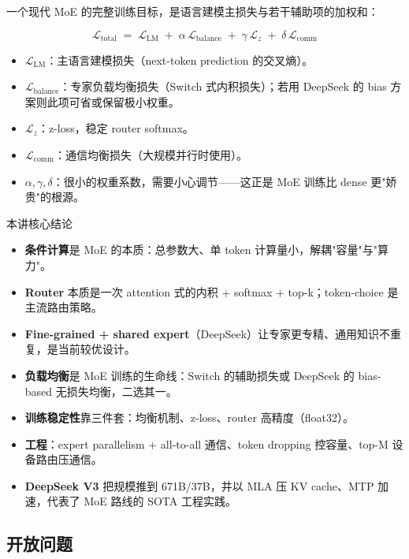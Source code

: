 \documentclass[a4paper]{article}
\begin{document}
一个现代 MoE 的完整训练目标，是语言建模主损失与若干辅助项的加权和：

\[
\mathcal{L}_{\text{total}} \;=\; \mathcal{L}_{\text{LM}} \;+\; \alpha\,\mathcal{L}_{\text{balance}} \;+\; \gamma\,\mathcal{L}_{z} \;+\; \delta\,\mathcal{L}_{\text{comm}}
\]

\begin{itemize}
\item $\mathcal{L}_{\text{LM}}$：主语言建模损失（next-token prediction 的交叉熵）。
\item $\mathcal{L}_{\text{balance}}$：专家负载均衡损失（Switch 式内积损失）；若用 DeepSeek 的 bias 方案则此项可省或保留极小权重。
\item $\mathcal{L}_{z}$：z-loss，稳定 router softmax。
\item $\mathcal{L}_{\text{comm}}$：通信均衡损失（大规模并行时使用）。
\item $\alpha,\gamma,\delta$：很小的权重系数，需要小心调节——这正是 MoE 训练比 dense 更"娇贵"的根源。
\end{itemize}

\begin{knowledgebox}{本讲核心结论}
\begin{itemize}
\item \textbf{条件计算}是 MoE 的本质：总参数大、单 token 计算量小，解耦"容量"与"算力"。
\item \textbf{Router} 本质是一次 attention 式的内积 + softmax + top-k；token-choice 是主流路由策略。
\item \textbf{Fine-grained + shared expert}（DeepSeek）让专家更专精、通用知识不重复，是当前较优设计。
\item \textbf{负载均衡}是 MoE 训练的生命线：Switch 的辅助损失或 DeepSeek 的 bias-based 无损失均衡，二选其一。
\item \textbf{训练稳定性}靠三件套：均衡机制、z-loss、router 高精度（float32）。
\item \textbf{工程}：expert parallelism + all-to-all 通信、token dropping 控容量、top-M 设备路由压通信。
\item \textbf{DeepSeek V3} 把规模推到 671B/37B，并以 MLA 压 KV cache、MTP 加速，代表了 MoE 路线的 SOTA 工程实践。
\end{itemize}
\end{knowledgebox}

\subsection{开放问题}
\end{document}

